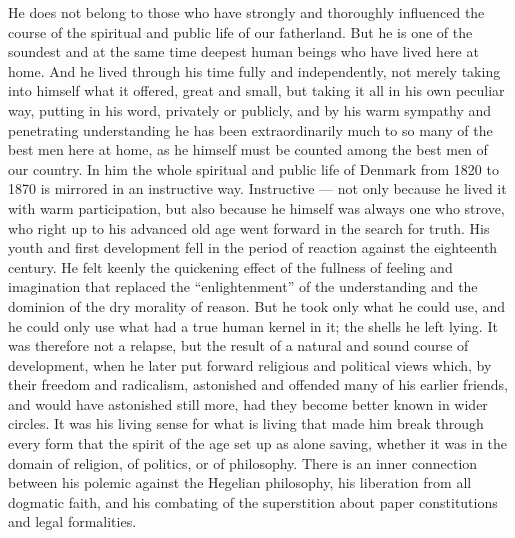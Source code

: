 \documentclass[12pt,a4paper,openany]{book}
\newcommand{\opage}[1]{\marginnote{\footnotesize\textit{[#1]}}}
\begin{document}
He does not belong to those who have strongly and thoroughly
influenced the course of the spiritual and public life of our
fatherland. But he is one of the soundest and at the same time
deepest human beings who have lived here at home. And he
lived through his time fully and independently, not merely taking
into himself what it offered, great and small, but taking it all
in his own peculiar way, putting in his word,
\opage{62}privately or publicly, and by his warm sympathy and
penetrating understanding he has been extraordinarily much
to so many of the best men here at home, as he himself
must be counted among the best men of our country. In him the whole
spiritual and public life of Denmark from 1820 to 1870
is mirrored in an instructive way. Instructive --- not only because he
lived it with warm participation, but also because
he himself was always one who strove, who right up to his advanced old age
went forward in the search for truth. His youth and first
development fell in the period of reaction against the eighteenth
century. He felt keenly the quickening effect of the
fullness of feeling and imagination that replaced the
``enlightenment'' of the understanding and the dominion of the dry morality of reason.
But he took only what he could use, and he could only
use what had a true human kernel in it; the shells
he left lying. It was therefore not a relapse, but
the result of a natural and sound course of development, when he
later put forward religious and political views which, by
their freedom and radicalism, astonished and offended many
of his earlier friends, and would have astonished still
more, had they become better known in wider circles.
It was his living sense for what is living that made him
break through every form that the spirit of the age set up as
alone saving, whether it was in the domain of religion, of
politics, or of philosophy. There is an inner
connection between his polemic against the Hegelian philosophy,
his liberation from all dogmatic faith, and his combating
of the superstition about paper constitutions and legal
formalities.
\end{document}

